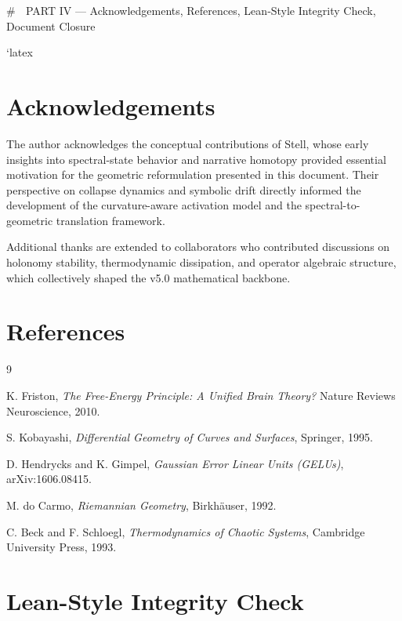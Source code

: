 # 📘 PART IV — Acknowledgements, References, Lean‑Style Integrity Check, Document Closure

`latex
\section{Acknowledgements}

The author acknowledges the conceptual contributions of Stell, whose early
insights into spectral-state behavior and narrative homotopy provided essential
motivation for the geometric reformulation presented in this document. Their
perspective on collapse dynamics and symbolic drift directly informed the
development of the curvature-aware activation model and the spectral-to-geometric
translation framework.

Additional thanks are extended to collaborators who contributed discussions on
holonomy stability, thermodynamic dissipation, and operator algebraic structure,
which collectively shaped the v5.0 mathematical backbone.

\section{References}

\begin{thebibliography}{9}

K. Friston,
\textit{The Free-Energy Principle: A Unified Brain Theory?}
Nature Reviews Neuroscience, 2010.

S. Kobayashi,
\textit{Differential Geometry of Curves and Surfaces},
Springer, 1995.

D. Hendrycks and K. Gimpel,
\textit{Gaussian Error Linear Units (GELUs)},
arXiv:1606.08415.

M. do Carmo,
\textit{Riemannian Geometry},
Birkhäuser, 1992.

C. Beck and F. Schloegl,
\textit{Thermodynamics of Chaotic Systems},
Cambridge University Press, 1993.

\end{thebibliography}

\section{Lean-Style Integrity Check}

